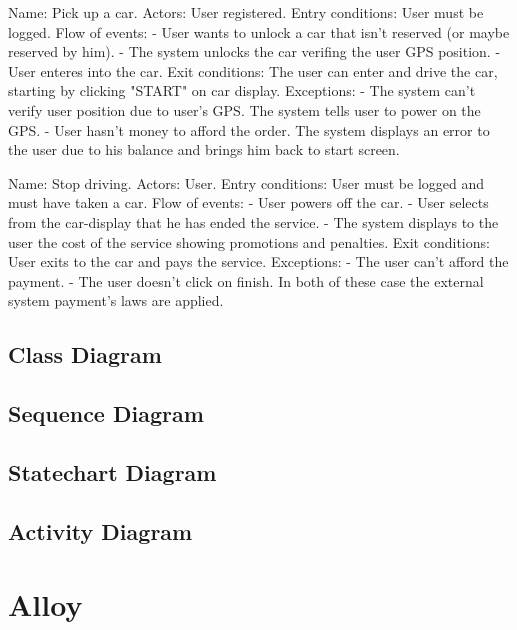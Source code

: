 \documentclass[11pt,a4paper]{report}
\begin{document}
Name: Pick up a car.
Actors: User registered.
Entry conditions: User must be logged.
Flow of events:
- User wants to unlock a car that isn't reserved (or maybe reserved by him).
- The system unlocks the car verifing the user GPS position.
- User enteres into the car.
Exit conditions: The user can enter and drive the car, starting by clicking "START" on car display.
Exceptions:
- The system can't verify user position due to user's GPS.
The system tells user to power on the GPS.
- User hasn't money to afford the order.
The system displays an error to the user due to his balance and brings him back to start screen.


Name: Stop driving.
Actors: User.
Entry conditions: User must be logged and must have taken a car.
Flow of events:
- User powers off the car.
- User selects from the car-display that he has ended the service.
- The system displays to the user the cost of the service showing promotions and penalties.
Exit conditions: User exits to the car and pays the service.
Exceptions:
- The user can't afford the payment.
- The user doesn't click on finish.
In both of these case the external system payment's laws are applied.
\subsection{Class Diagram}
\subsection{Sequence Diagram}
\subsection{Statechart Diagram}
\subsection{Activity Diagram}
\section{Alloy}
\end{document}
